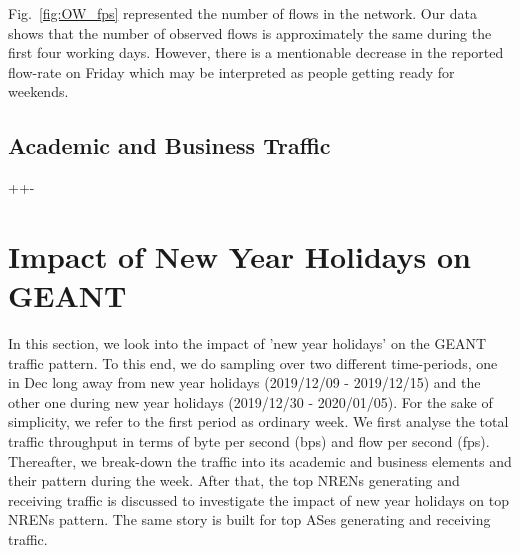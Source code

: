 \documentclass[10pt, journal, letterpaper]{IEEEtran}
\begin{document}
Fig.~\ref{fig:OW_fps} represented the number of flows in the network. Our data shows that the number of observed flows is approximately the same during the first four working days. However, there is a mentionable decrease in the reported flow-rate on Friday which may be interpreted as people getting ready for weekends.

\subsection{Academic and Business Traffic}

++-

\section{Impact of New Year Holidays on GEANT}
In this section, we look into the impact of 'new year holidays' on the GEANT traffic pattern. To this end, we do sampling over two different time-periods, one in Dec long away from new year holidays (2019/12/09 - 2019/12/15) and the other one during new year holidays (2019/12/30 - 2020/01/05). For the sake of simplicity, we refer to the first period as ordinary week. We first analyse the total traffic throughput in terms of byte per second (bps) and flow per second (fps). Thereafter, we break-down the traffic into its academic and business elements and their pattern during the week. After that, the top NRENs generating and receiving traffic is discussed to investigate the impact of new year holidays on top NRENs pattern. The same story is built for top ASes generating and receiving traffic.
\end{document}
